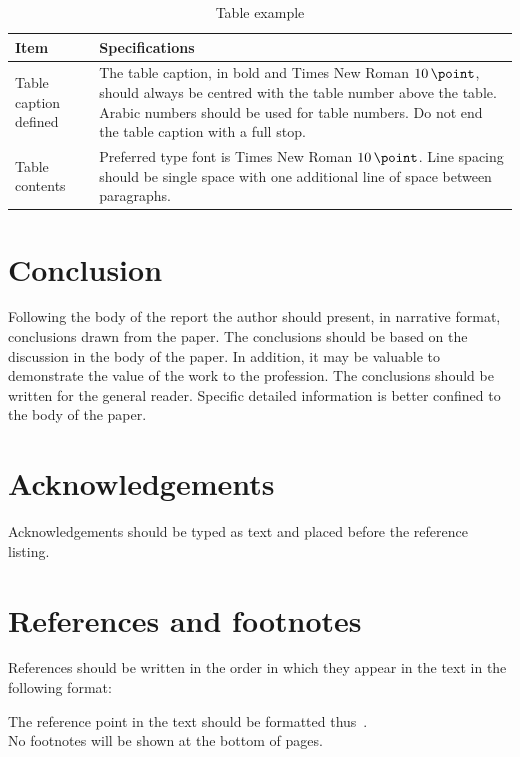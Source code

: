 \documentclass[12pt, a4paper]{article}
\begin{document}
\begin{table}[H]
  \centering
  \caption{Table example}\label{tab:my_label}
  \begin{footnotesize}
    \begin{tabular}{p{6cm}p{8.7cm}}
      \hline
      Item                  & Specifications                                                                                                                                                                                                                        \\\hline
      Table caption defined & The table caption, in bold and Times New Roman \(\SI{10}{\point}\), should always be centred with the table number above the table.  Arabic numbers should be used for table numbers.  Do not end the table caption with a full stop. \\\hline
      Table contents        & Preferred type font is Times New Roman \(\SI{10}{\point}\).  Line spacing should be single space with one additional line of space between paragraphs.                                                                                \\\hline
    \end{tabular}
  \end{footnotesize}
\end{table}

\section{Conclusion}
Following the body of the report the author should present, in narrative format, conclusions drawn from the paper. The conclusions should be based on the discussion in the body of the paper. In addition, it may be valuable to demonstrate the value of the work to the profession. The conclusions should be written for the general reader. Specific detailed information is better confined to the body of the paper.

\section*{Acknowledgements}
Acknowledgements should be typed as text and placed before the reference listing.

\section*{References and footnotes}
References should be written in the order in which they appear in the text in the following format:

\printbibliography[heading=none]

The reference point in the text should be formatted thus~\cite{Tan1977}.\\

No footnotes will be shown at the bottom of pages.
\end{document}
